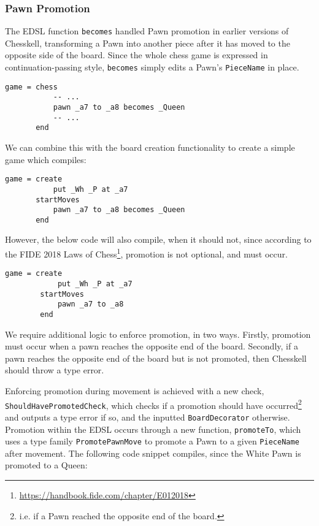 \documentclass[12pt, a4paper, bibliography=totocnumbered]{scrartcl}
\begin{document}
\subsubsection{Pawn Promotion}

The EDSL function \lstinline{becomes} handled Pawn promotion in earlier versions of Chesskell, transforming a Pawn into another piece after it has moved to the opposite side of the board. Since the whole chess game is expressed in continuation-passing style, \lstinline{becomes} simply edits a Pawn's \lstinline{PieceName} in place. %

\begin{lstlisting}
game = chess
           -- ...
           pawn _a7 to _a8 becomes _Queen
           -- ...
       end
\end{lstlisting}

We can combine this with the board creation functionality to create a simple game which compiles:

\begin{lstlisting}
game = create
           put _Wh _P at _a7
       startMoves
           pawn _a7 to _a8 becomes _Queen
       end
\end{lstlisting}

However, the below code will also compile, when it should not, since according to the FIDE 2018 Laws of Chess\footnote{\url{https://handbook.fide.com/chapter/E012018}}, promotion is not optional, and must occur.

\begin{lstlisting}
game = create
            put _Wh _P at _a7
        startMoves
            pawn _a7 to _a8
        end
\end{lstlisting}

We require additional logic to enforce promotion, in two ways. Firstly, promotion must occur when a pawn reaches the opposite end of the board. Secondly, if a pawn reaches the opposite end of the board but is not promoted, then Chesskell should throw a type error.

Enforcing promotion during movement is achieved with a new check, \lstinline{ShouldHavePromotedCheck}, which checks if a promotion should have occurred\footnote{i.e. if a Pawn reached the opposite end of the board.} and outputs a type error if so, and the inputted \lstinline{BoardDecorator} otherwise. Promotion within the EDSL occurs through a new function, \lstinline{promoteTo}, which uses a type family \lstinline{PromotePawnMove} to promote a Pawn to a given \lstinline{PieceName} after movement. The following code snippet compiles, since the White Pawn is promoted to a Queen:
\end{document}
